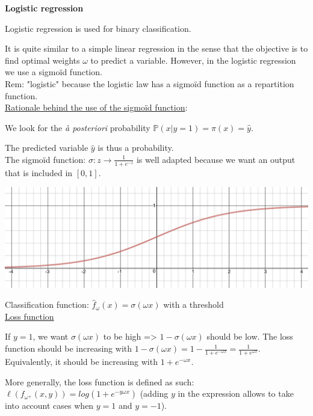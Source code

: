 {\fontsize{12pt}{22pt} \textbf{Logistic regression}\par}

\vspace{5mm}

Logistic regression is used for binary classification.

It is quite similar to a simple linear regression in the sense that the objective is to find optimal weights $\omega$ to predict a variable. However, in the logistic regression we use a sigmoïd function.\\

Rem: "logistic" because the logistic law has a sigmoïd function as a repartition function.\\

\underline{Rationale behind the use of the sigmoïd function}:

We look for the \textit{à posteriori} probability $\mathbb{P}(x | y=1) = \pi (x) = \hat{y}$.

The predicted variable $\hat{y}$ is thus a probability.  \\

The sigmoïd function: $\sigma: z \to \frac{1}{1+e^{-z}}$ is well adapted because we want an output that is included in $[0,1]$.

\begin{center}
\includegraphics[scale=0.15]{sigmoid.png}
\end{center}

Classification function: $\widehat{f}_{\omega}(x) = \sigma(\omega x)$ with a threshold \\

\underline{Loss function}

If $y = 1$, we want $\sigma(\omega x)$ to be high => $1 - \sigma(\omega x)$ should be low. The loss function should be increasing with $1 - \sigma(\omega x) = 1 - \frac{1}{1+e^{-\omega x}} = \frac{1}{1+e^{\omega x}}$. Equivalently, it should be increasing with $1 + e^{-\omega x}$.

More generally, the loss function is defined as such: $\ell(f_{\omega}, (x,y)) = log(1 + e^{-y \omega x})$ (adding $y$ in the expression allows to take into account cases when $y = 1$ and $y = -1$).

